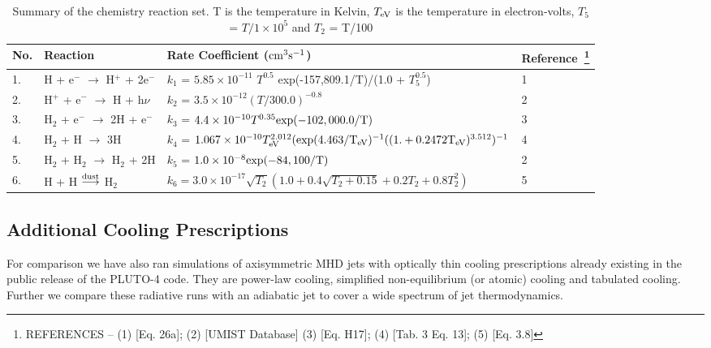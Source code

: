 \documentclass[useAMS,usenatbib,letters]{mn2e}
\begin{document}
\begin{table*}
\begin{minipage}{\textwidth}
\caption{Summary of the chemistry reaction set. T is the temperature
  in Kelvin, $T_{\rm eV}$ is the temperature in electron-volts, $T_{5}$
  = $T/1\times10^{5}$  and 
$T_{2}$  = T/100}
\label{tab:chemeq}
\begin{tabular}{l l l l}
\hline
No. & Reaction & Rate Coefficient ($\rm {cm}^{3} s^{-1}$) &
Reference~\footnote{REFERENCES -- (1) \cite{Cen:1992p13616} [Eq. 26a];
  (2) \cite{Woodall:2007p13623} [UMIST Database] (3)
  \cite{Galli:1998p13066} [Eq. H17]; (4) \cite{Abel:1997p12836}
  [Tab. 3 Eq. 13]; (5) \cite{Hollenbach:1979p12707} [Eq. 3.8]}\\
\hline
1. & H + e$^{-}$ $\rightarrow$ H$^{+}$ + 2e$^{-}$ & $k_1$ = $5.85
\times 10^{-11}$ $T^{0.5}$ \rm{exp}(-157,809.1/T)/(1.0 + $T_{5}^{0.5}$) & 1\\
2. & H$^{+}$ + e$^{-}$ $\rightarrow$ H + h$\nu$ & $k_2$ =
$3.5\times10^{-12} (T/300.0)^{-0.8}$ & 2\\
3. & H$_{2}$ + e$^{-}$ $\rightarrow$ 2H + e$^{-}$ & $k_3$ =
$4.4\times10^{-10} T^{0.35} \rm{exp}(-102,000.0/T)$ & 3\\
4. & H$_{2}$ + H $\rightarrow$ 3H & $k_4$ = $1.067\times10^{-10}
T_{\rm eV}^{2.012}(\rm{exp}(4.463/T_{\rm eV})^{-1}((1. + 0.2472 T_{\rm eV})^{3.512})^{-1} $& 4\\
5. &H$_{2}$ + H$_{2}$ $\rightarrow$ H$_{2}$ + 2H & $k_5$ = $1.0\times 10^{-8} \rm{exp}(-84,100/T)$ & 2\\
6. & H + H $\overset{\rm dust}\longrightarrow$ H$_{2}$ & $k_6 =
3.0\times10^{-17}\sqrt{T_{2}}(1.0 + 0.4\sqrt{T_{2} + 0.15} + 0.2T_{2} + 0.8T_{2}^{2})$ & 5 \\
\hline
\end{tabular}
\end{minipage}
\end{table*}

\subsection{Additional Cooling Prescriptions}
%
For comparison we have also ran simulations of axisymmetric MHD jets
with optically thin cooling prescriptions already existing in the public
release of the PLUTO-4 code. They are power-law cooling, 
simplified non-equilibrium (or atomic) cooling and tabulated
cooling. Further we compare these radiative runs with an adiabatic jet 
to cover a wide spectrum of jet thermodynamics. 
%
\end{document}
